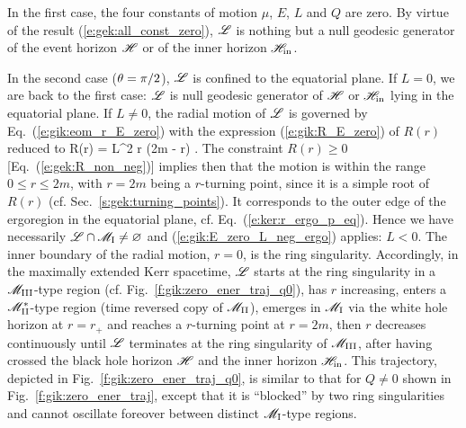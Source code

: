 In the first case, the four constants of motion $\mu$, $E$, $L$ and $Q$ are
zero. By virtue of the result (\ref{e:gek:all_const_zero}), $\mathscr{L}$
is nothing but a null geodesic generator of the event horizon $\mathscr{H}$ or of the
inner horizon $\mathscr{H}_{\rm in}$.

In the second case ($\theta=\pi/2$), $\mathscr{L}$ is confined to the equatorial plane.
If $L=0$, we are back to the first case: $\mathscr{L}$ is null geodesic generator of $\mathscr{H}$ or
$\mathscr{H}_{\rm in}$ lying in the equatorial plane.
If $L\neq 0$, the radial motion of $\mathscr{L}$ is governed by Eq.~(\ref{e:gik:eom_r_E_zero}) with the
expression (\ref{e:gik:R_E_zero}) of $R(r)$ reduced to
\be
    R(r) = L^2 r (2m - r) .
\ee
The constraint $R(r) \geq 0$ [Eq.~(\ref{e:gek:R_non_neg})] implies then
that the motion is within the range $0 \leq r \leq 2 m$, with $r=2m$
being a $r$-turning point, since it is a simple root of $R(r)$ (cf. Sec.~\ref{s:gek:turning_points}).
It corresponds to the outer edge of the ergoregion in the equatorial plane,
cf. Eq.~(\ref{e:ker:r_ergo_p_eq}). Hence we have necessarily $\mathscr{L}\cap \mathscr{M}_{\rm I} \neq \varnothing$
and (\ref{e:gik:E_zero_L_neg_ergo}) applies: $L < 0$.
The inner boundary of the radial motion, $r=0$, is the ring singularity.
Accordingly, in the maximally extended Kerr spacetime, $\mathscr{L}$ starts at the ring
singularity in a $\mathscr{M}_{\rm III}$-type region (cf. Fig.~\ref{f:gik:zero_ener_traj_q0}),
has $r$ increasing, enters
a $\mathscr{M}_{\rm II}^*$-type region (time reversed copy of $\mathscr{M}_{\rm II}$), emerges
in $\mathscr{M}_{\rm I}$ via the white hole horizon at $r=r_+$ and reaches a $r$-turning point at
$r=2m$, then $r$ decreases continuously until $\mathscr{L}$ terminates at the ring
singularity of $\mathscr{M}_{\rm III}$, after having crossed the black hole horizon $\mathscr{H}$
and the inner horizon $\mathscr{H}_{\rm in}$.
This trajectory, depicted in
Fig.~\ref{f:gik:zero_ener_traj_q0}, is similar to that for $Q\neq 0$
shown in Fig.~\ref{f:gik:zero_ener_traj}, except that it is ``blocked''
by two ring singularities and cannot oscillate foreover between distinct
$\mathscr{M}_{\rm I}$-type regions.

